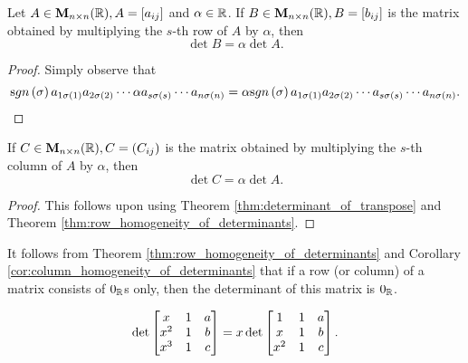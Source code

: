 \begin{thm}\label{thm:row_homogeneity_of_determinants}
Let $A \in {\mathbf M}_{n\times n}( \mathbb{R}), A = [a_{ij}]$ and $\alpha\in
\mathbb{R}$. If $B \in {\mathbf M}_{n\times n}( \mathbb{R}), B = [b_{ij}]$ is the
matrix obtained by multiplying the $s$-th row of $A$ by $\alpha$,
then
$$\det B = \alpha \det A.
$$
\end{thm}
\begin{proof}
Simply observe that $$\sgn{\sigma} a_{1\sigma (1)}a_{2\sigma
(2)}\cdots \alpha a_{s\sigma (s)} \cdots a_{n\sigma (n)} = \alpha
\sgn{\sigma} a_{1\sigma (1)}a_{2\sigma (2)}\cdots  a_{s\sigma (s)}
\cdots a_{n\sigma (n)}.
$$

\end{proof}
\begin{cor}\label{cor:column_homogeneity_of_determinants}
If $C \in {\mathbf M}_{n\times n}( \mathbb{R}), C = (C_{ij})$ is the matrix
obtained by multiplying the $s$-th column of $A$ by $\alpha$, then
$$\det C = \alpha \det A.
$$
\end{cor}
\begin{proof}
This follows upon using Theorem \ref{thm:determinant_of_transpose}
and Theorem \ref{thm:row_homogeneity_of_determinants}.
\end{proof}
\begin{rem}
It follows from Theorem \ref{thm:row_homogeneity_of_determinants}
and Corollary \ref{cor:column_homogeneity_of_determinants} that if a
row (or column) of a matrix consists of $0_{\mathbb{R}}$s only, then the
determinant of this matrix is $0_{\mathbb{R}}$.
\end{rem}
\begin{exa}
$$\det
\begin{bmatrix} x & 1 & a \cr x^2 & 1 & b \cr x^3 & 1 & c
\cr\end{bmatrix} = x\det\begin{bmatrix} 1 & 1 & a \cr x & 1 & b
\cr x^2 & 1 & c \cr\end{bmatrix}. $$
\end{exa}

